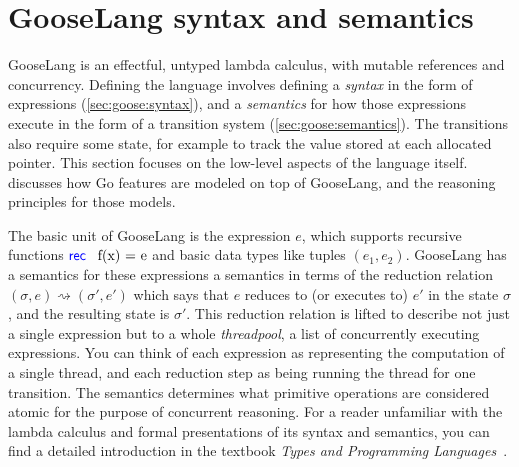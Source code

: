 \section{GooseLang syntax and semantics}%
\label{sec:goose:lang}

\newcommand{\binop}{\circledcirc}
\newcommand{\unop}{\circleddash}

\newcommand{\external}{\mathsf{\textcolor{red}{\langle External \rangle}}}

\newcommand{\gooseif}[3]{\goosekw{if} \app #1 \app%
  \goosekw{then} \app #2 \app \goosekw{else} \app #3}

\newcommand{\recfx}{\mbox{\goosekw{rec} \, f(x) = e}}
\newcommand{\gooselambda}[1]{\goosekw{\lambda}#1.\,}

\newcommand{\reduces}{\rightsquigarrow}
\newcommand{\purereduction}{\overset{\mathrm{pure}}{\reduces}}

GooseLang is an effectful, untyped lambda calculus, with mutable references and
concurrency. Defining the language involves defining a \emph{syntax} in the form
of expressions (\cref{sec:goose:syntax}), and a \emph{semantics} for how those expressions execute in the
form of a transition system (\cref{sec:goose:semantics}). The transitions also require some state, for
example to track the value stored at each allocated pointer. This section
focuses on the low-level aspects of the language itself.
 discusses how Go features are modeled on top of
GooseLang, and the reasoning principles for those models.

The basic unit of GooseLang is the expression $e$, which supports recursive
functions $\recfx$ and basic data types like tuples $(e_1, e_2)$. GooseLang has
a semantics for
these expressions a semantics in terms of the reduction relation
$(\sigma, e) \reduces (\sigma', e')$ which says that $e$ reduces to (or executes
to) $e'$ in the state $\sigma$, and the resulting state is $\sigma'$. This
reduction relation is lifted to describe not just a single expression but to a
whole \emph{threadpool}, a list of concurrently executing expressions. You
can think of each expression as representing the computation of a single thread,
and each reduction step as being running the thread for one transition. The
semantics determines what primitive operations are considered atomic for the
purpose of concurrent reasoning. For a reader unfamiliar with the lambda
calculus and formal presentations of its syntax and semantics, you can find
a detailed introduction in the textbook \emph{Types and Programming
Languages}~\cite[Chapter~5]{pierce:tapl}.


